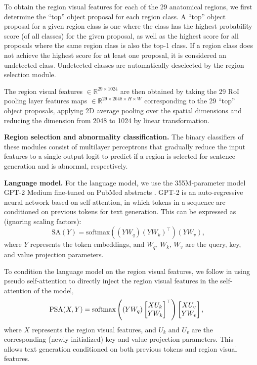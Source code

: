 \documentclass[10pt,twocolumn,letterpaper]{article}
\begin{document}
To obtain the region visual features for each of the 29 anatomical regions, we first determine the “top” object proposal for each region class. A “top” object proposal for a given region class is one where the class has the highest probability score (of all classes) for the given proposal, as well as the highest score for all proposals where the same region class is also the top-1 class. If a region class does not achieve the highest score for at least one proposal, it is considered an undetected class. Undetected classes are automatically deselected by the region selection module.

The region visual features $\in \mathbb{R}^{29 \times 1024}$ are then obtained by taking the 29 RoI pooling layer features maps $\in \mathbb{R}^{29 \times 2048 \times H \times W}$ corresponding to the 29 “top” object proposals, applying 2D average pooling over the spatial dimensions and reducing the dimension from 2048 to 1024 by linear transformation.


\noindent\textbf{Region selection and abnormality classification.} The binary classifiers of these modules consist of multilayer perceptrons that gradually reduce the input features to a single output logit to predict if a region is selected for sentence generation and is abnormal, respectively.

\noindent\textbf{Language model.} For the language model, we use the 355M-parameter model GPT-2 Medium \cite{radford2019language} fine-tuned on PubMed  abstracts \cite{papanikolaou2020dare}. GPT-2 is an auto-regressive neural network based on self-attention, in which tokens in a sequence are conditioned on previous tokens for text generation. This can be expressed as (ignoring scaling factors):
\begin{equation}
\text{SA}(Y) = \text{softmax}((YW_{q})(YW_{k})^{\top})(YW_{v}),
  \label{eq:self-attention}
\end{equation}
where $Y$ represents the token embeddings, and $W_{q}$, $W_{k}$, $W_{v}$ are the query, key, and value projection parameters.

To condition the language model on the region visual features, we follow \cite{alfarghaly2021automated} in using pseudo self-attention \cite{ziegler2019encoder} to directly inject the region visual features in the self-attention of the model, \ie
\begin{equation}
\hspace*{-0.2cm}
\text{PSA}(X,Y) = \text{softmax}\left((YW_{q})\begin{bmatrix}
XU_{k}\\ 
YW_{k}
\end{bmatrix}^{\top}\right)\begin{bmatrix}
XU_{v}\\ 
YW_{v}
\end{bmatrix},
  \label{eq:pseudo-self-attention}
\end{equation}
where $X$ represents the region visual features, and $U_{k}$ and $U_{v}$ are the corresponding (newly initialized) key and value projection parameters. This allows text generation conditioned on both previous tokens and region visual features.
\end{document}
